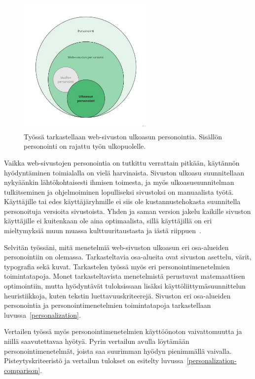 \documentclass[finnish, 12pt, a4paper, elec, utf8, a-1b, online]{aaltothesis}
\begin{document}
\begin{figure}[h]
    \centering
    \includegraphics[width=0.6\textwidth]{images/thesis-scope.jpg}
    \caption{Työssä tarkastellaan web-sivuston ulkoasun personointia. Sisällön
    personointi on rajattu työn ulkopuolelle.~\label{fig:thesis-scope}}
\end{figure}

Vaikka web-sivustojen personointia on tutkittu verrattain pitkään, käytännön
hyödyntäminen toimialalla on vielä harvinaista. Sivuston ulkoasu suunnitellaan
nykyäänkin lähtökohtaisesti ihmisen toimesta, ja myös ulkoasusuunnitelman
tulkitseminen ja ohjelmoiminen lopulliseksi sivustoksi on manuaalista työtä.
Käyttäjille tai edes käyttäjäryhmille ei siis ole kustannustehokasta suunnitella
personoituja versioita sivustoista. Yhden ja saman version jakelu kaikille
sivuston käyttäjille ei kuitenkaan ole aina optimaalista, sillä käyttäjillä on
eri mieltymyksiä muun muassa kulttuuritaustasta ja iästä
riippuen~\cite{10.1145/2556288.2557052}.

Selvitän työssäni, mitä menetelmiä web-sivuston ulkoasun eri osa-alueiden
personointiin on olemassa. Tarkasteltavia osa-alueita ovat sivuston asettelu,
värit, typografia sekä kuvat. Tarkastelen työssä myös eri personointimenetelmien
toimintatapoja. Monet tarkasteltavista menetelmistä perustuvat matemaattisen
optimointiin, mutta hyödyntävät tuloksissaan lisäksi käyttöliittymäsuunnittelun
heuristiikkoja, kuten tekstin luettavuuskriteerejä. Sivuston eri osa-alueiden
personointia ja personointimenetelmien toimintatapoja tarkastellaan
luvussa~\ref{personalization}.

Vertailen työssä myös personointimenetelmien käyttöönoton vaivattomuutta ja
niillä saavutettavaa hyötyä. Pyrin vertailun avulla löytämään
personointimenetelmät, joista saa suurimman hyödyn pienimmällä vaivalla.
Pisteytyskriteeristö ja vertailun tulokset on esitelty
luvussa~\ref{personalization-comparison}.
\end{document}

